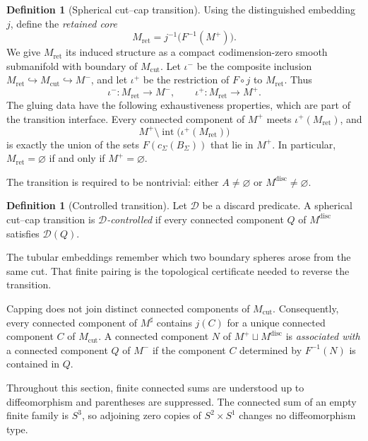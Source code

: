 \documentclass[10pt]{coll-l}
\theoremstyle{definition}
\newtheorem{definition}[theorem]{Definition}
\theoremstyle{remark}
\numberwithin{section}{chapter}
\numberwithin{equation}{chapter}
\begin{document}
\begin{definition}[Spherical cut--cap transition]
Using the distinguished embedding $j$, define the \emph{retained core}
\[
  M_{\mathrm{ret}}
  =
  j^{-1}\bigl(F^{-1}(M^{+})\bigr).
\]
We give $M_{\mathrm{ret}}$ its induced structure as a compact
codimension-zero smooth submanifold with boundary of $M_{\mathrm{cut}}$.
Let $\iota^{-}$ be the composite inclusion
$M_{\mathrm{ret}}\hookrightarrow M_{\mathrm{cut}}\hookrightarrow M^{-}$, and
let $\iota^{+}$ be the restriction of $F\circ j$ to $M_{\mathrm{ret}}$.
Thus
\[
  \iota^{-}\colon M_{\mathrm{ret}}\longrightarrow M^{-},
  \qquad
  \iota^{+}\colon M_{\mathrm{ret}}\longrightarrow M^{+}.
\]
The gluing data have the following exhaustiveness properties, which are part
of the transition interface.
Every connected component of $M^{+}$ meets
$\iota^{+}(M_{\mathrm{ret}})$, and
\[
  M^{+}\setminus
  \operatorname{int}\bigl(\iota^{+}(M_{\mathrm{ret}})\bigr)
\]
is exactly the union of the sets
$F(c_{\Sigma}(B_{\Sigma}))$ that lie in $M^{+}$.  In particular,
$M_{\mathrm{ret}}=\varnothing$ if and only if $M^{+}=\varnothing$.

The transition is required to be nontrivial: either $A\neq\varnothing$ or
$M^{\mathrm{disc}}\neq\varnothing$.
\end{definition}

\begin{definition}[Controlled transition]
\label{def:controlled-transition}
Let $\mathcal D$ be a discard predicate.  A spherical cut--cap transition is
\emph{$\mathcal D$-controlled} if every connected component $Q$ of
$M^{\mathrm{disc}}$ satisfies $\mathcal D(Q)$.
\end{definition}

The tubular embeddings remember which two boundary spheres arose from the
same cut.  That finite pairing is the topological certificate needed to
reverse the transition.

Capping does not join distinct connected components of
$M_{\mathrm{cut}}$.  Consequently, every connected component of
$M^{\sharp}$ contains $j(C)$ for a unique connected component $C$ of
$M_{\mathrm{cut}}$.  A connected component $N$ of
$M^{+}\sqcup M^{\mathrm{disc}}$ is \emph{associated with} a connected
component $Q$ of $M^{-}$ if the component $C$ determined by
$F^{-1}(N)$ is contained in $Q$.

Throughout this section, finite connected sums are understood up to
diffeomorphism and parentheses are suppressed.  The connected sum of an
empty finite family is $S^{3}$, so adjoining zero copies of
$S^{2}\times S^{1}$ changes no diffeomorphism type.
\end{document}
